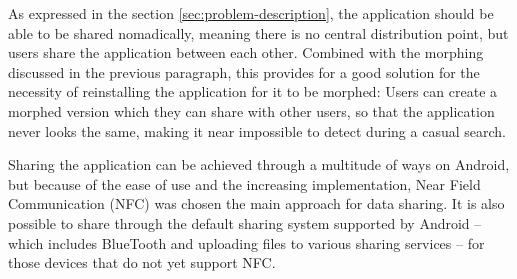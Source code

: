 As expressed in the section \ref{sec:problem-description}, the application should be able to be shared nomadically, meaning there is no central distribution point, but users share the application between each other. 
Combined with the morphing discussed in the previous paragraph, this provides for a good solution for  the necessity  of reinstalling the application for it to be morphed: 
Users can create a morphed version which they can share with other users, so that the application never looks the same, making it near impossible to detect during a casual search.

Sharing the application can be achieved through a multitude of ways on Android, but because of the ease of use and the increasing implementation, Near Field Communication (NFC) was chosen the main approach for data sharing. 
It is also possible to share through the default sharing system supported by Android -- which includes BlueTooth and uploading files to various sharing services -- for those devices that do not yet support NFC.